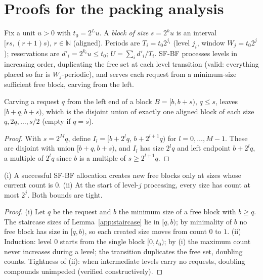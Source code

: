 \appendix

\section{Proofs for the packing analysis}

Fix a unit $u > 0$ with $t_0 = 2^L u$. A \emph{block of size} $s = 2^k u$ is
an interval $[rs, (r{+}1)s)$, $r \in \mathbb{N}$ (aligned). Periods are
$T_i = t_0 2^{j_i}$ (level $j_i$, window $W_j = t_0 2^j$); reservations are
$d'_i = 2^{k_i} u \le t_0$; $U = \sum_i d'_i / T_i$. SF-BF processes levels
in increasing order, duplicating the free set at each level transition
(valid: everything placed so far is $W_j$-periodic), and serves each
request from a minimum-size sufficient free block, carving from the left.

\begin{lemma}
\label{app:staircase}
Carving a request $q$ from the left end of a block $B = [b, b+s)$,
$q \le s$, leaves $[b+q, b+s)$, which is the disjoint union of exactly one
aligned block of each size $q, 2q, \dots, s/2$ (empty if $q = s$).
\end{lemma}

\begin{proof}
With $s = 2^M q$, define $I_l = [b + 2^l q,\, b + 2^{l+1} q)$ for
$l = 0, \dots, M{-}1$. These are disjoint with union $[b+q, b+s)$, and
$I_l$ has size $2^l q$ and left endpoint $b + 2^l q$, a multiple of
$2^l q$ since $b$ is a multiple of $s \ge 2^{l+1} q$.
\end{proof}

\begin{lemma}
\label{app:counts}
(i) A successful SF-BF allocation creates new free blocks only at sizes
whose current count is $0$. (ii) At the start of level-$j$ processing,
every size has count at most $2^j$. Both bounds are tight.
\end{lemma}

\begin{proof}
(i) Let $q$ be the request and $b$ the minimum size of a free block with
$b \ge q$. The staircase sizes of Lemma~\ref{app:staircase} lie in
$[q, b)$; by minimality of $b$ no free block has size in $[q, b)$, so each
created size moves from count $0$ to $1$. (ii) Induction: level $0$ starts
from the single block $[0, t_0)$; by (i) the maximum count never increases
during a level; the transition duplicates the free set, doubling counts.
Tightness of (ii): when intermediate levels carry no requests, doubling
compounds unimpeded (verified constructively).
\end{proof}

